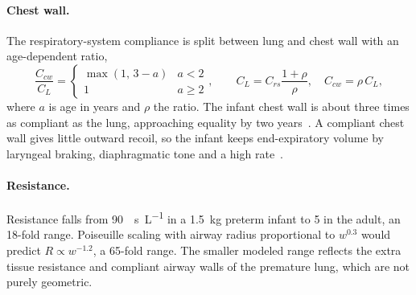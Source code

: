 \paragraph{Chest wall.} The respiratory-system compliance is split between lung and chest wall with an age-dependent ratio,
\begin{equation}
\frac{C_{cw}}{C_L}=\begin{cases}\max(1,\,3-a) & a<2\\ 1 & a\ge2\end{cases},\qquad
C_L=C_{rs}\frac{1+\rho}{\rho},\quad C_{cw}=\rho\,C_L,
\label{eq:par-ccw}
\end{equation}
where $a$ is age in years and $\rho$ the ratio. The infant chest wall is about three times as compliant as the lung, approaching equality by two years~\citep{papastamelos1995,davis1987}. A compliant chest wall gives little outward recoil, so the infant keeps end-expiratory volume by laryngeal braking, diaphragmatic tone and a high rate~\citep{muller1979}.

\paragraph{Resistance.} Resistance falls from \SI{90}{\cmH\second\per\liter} in a \SI{1.5}{\kilo\gram} preterm infant to 5 in the adult, an 18-fold range. Poiseuille scaling with airway radius proportional to $w^{0.3}$ would predict $R\propto w^{-1.2}$, a 65-fold range. The smaller modeled range reflects the extra tissue resistance and compliant airway walls of the premature lung, which are not purely geometric.

